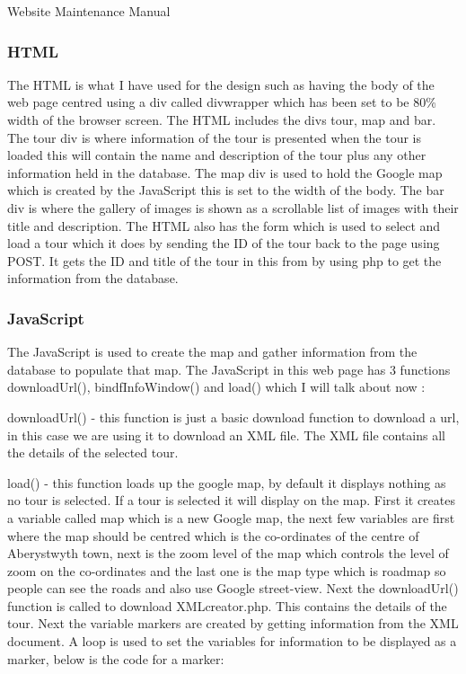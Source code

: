 \documentclass{article}
\begin{document}
\begin{section}{Website Maintenance Manual}
		\subsubsection{HTML}
The HTML is what I have used for the design such as having the body of the web page centred using a div called divwrapper which has been set to be 80\% width of the browser screen. The HTML includes the divs tour, map and bar. The tour div is where information of the tour is presented when the tour is loaded this will contain the name and description of the tour plus any other information held in the database. The map div is used to hold the Google map which is created by the JavaScript this is set to the width of the body. The bar div is where the gallery of images is shown as a scrollable list of images with their title and description. The HTML also has the form which is used to select and load a tour which it does by sending the ID of the tour back to the page using POST. It gets the ID and title of the tour in this from by using php to get the information from the database.

		\subsubsection{JavaScript}
		The JavaScript is used to create the map and gather information from the database to populate that map. The JavaScript in this web page has 3 functions downloadUrl(), bindfInfoWindow() and load() which I will talk about now :

downloadUrl() - this function is just a basic download function to download a url, in this case we are using it to download an XML file. The XML file contains all the details of the selected tour. 

load() - this function loads up the google map, by default it displays nothing as no tour is selected. If a tour is selected it will display on the map. First it creates a variable called map which is a new Google map, the next few variables are first where the map should be centred which is the co-ordinates of the centre of Aberystwyth town, next is the zoom level of the map which controls the level of zoom on the co-ordinates and the last one is the map type which is roadmap so people can see the roads and also use Google street-view. Next the downloadUrl() function is called to download XMLcreator.php. This contains the details of the tour. Next the variable markers are created by getting information from the XML document. A loop is used to set the variables for information to be displayed as a marker, below is the code for a marker:


\end{section}
\end{document}
